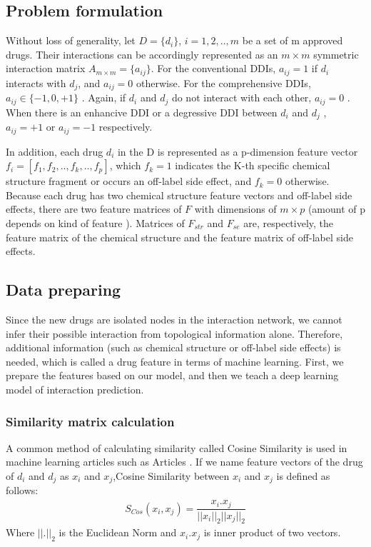 \documentclass{bmcart}
\begin{document}
\subsection*{Problem formulation}

Without loss of generality, let $D = \{d_i\}$, $i = 1, 2, .., m$ be a set of m approved drugs. Their  interactions can be accordingly represented as an $m \times m$ symmetric interaction matrix $A_{m \times m} = \{a_{ij}\}$. For the conventional DDIs, $a_{ij} = 1$ if $d_i$ interacts with $d_j$, and $a_{ij} = 0$ otherwise. For the comprehensive DDIs, $a_{ij} \in \{-1, 0, +1\}$ . Again, if $d_i$ and $d_j$ do not interact with each other, $a_{ij} = 0$ . When there is an enhancive DDI or a degressive DDI between $d_i$ and $d_j$ , $a_{ij} = +1$ or $a_{ij} = -1$ respectively.

In addition, each drug $d_i$ in the D is represented as a p-dimension feature vector $f_i = \left[  f_1, f_2, .., f_k, .., f_p \right]$, which $f_k = 1$ indicates the K-th specific chemical structure fragment or occurs an off-label side effect, and $f_k = 0$ otherwise. Because each drug has two chemical structure feature vectors and off-label side effects, there are two feature matrices of $F$ with dimensions of $m \times p$ (amount of p depends on kind of feature ). Matrices of $F_{str}$ and $F_{se}$ are, respectively, the feature matrix of the chemical structure and the feature matrix of off-label side effects.

\subsection*{Data preparing}
Since the new drugs are isolated nodes in the interaction network, we cannot infer their possible interaction from topological information alone. Therefore, additional information (such as chemical structure or off-label side effects) is needed, which is called a drug feature in terms of machine learning. First, we prepare the features based on our model, and then we teach a deep learning model of interaction prediction.

\subsubsection*{Similarity matrix calculation}

A common method of calculating similarity called Cosine Similarity is used in machine learning articles such as Articles \cite{zhang2016drug, zhang2018manifold}. If we name feature vectors of the drug of $d_i$ and $d_j$
as $x_i$ and $x_j$,Cosine Similarity between $x_i$ and $x_j$ is defined as follows:
\begin{equation}
	\begin{aligned}
		S_{Cos}(x_i,x_j) =\dfrac{x_i . x_j}{||x_i||_2 ||x_j||_2}
	\end{aligned}
\end{equation}
Where $||.||_2$ is the Euclidean Norm and ${x_i . x_j}$ is inner product of two vectors.
\end{document}
